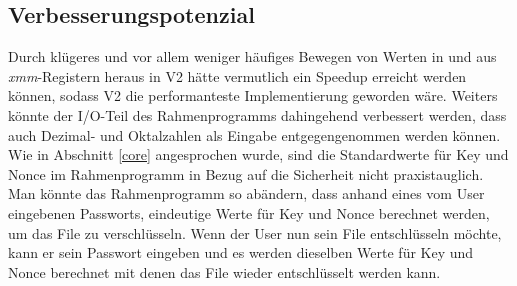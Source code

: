 \documentclass[course=erap]{aspdoc}
\begin{document}
\subsection{Verbesserungspotenzial}
Durch klügeres und vor allem weniger häufiges Bewegen von Werten in und aus \emph{xmm}-Registern heraus
in V2 hätte vermutlich ein Speedup erreicht werden können, sodass V2 die performanteste Implementierung
geworden wäre.
Weiters könnte der I/O-Teil des Rahmenprogramms dahingehend verbessert werden, dass auch Dezimal- und
Oktalzahlen als Eingabe entgegengenommen werden können.
Wie in Abschnitt \ref{core} angesprochen wurde, sind die Standardwerte für Key und Nonce im Ra\-hmen\-pro\-gramm 
in Bezug auf die Sicherheit nicht praxistauglich.
Man könnte das Ra\-hmen\-pro\-gramm so abändern, dass anhand eines vom User eingebenen Passworts, 
eindeutige Werte für Key und Nonce berechnet werden, um das File zu verschlüsseln. Wenn der User nun 
sein File entschlüsseln möchte, kann er sein Passwort eingeben und es werden dieselben Werte für 
Key und Nonce berechnet mit denen das File wieder entschlüsselt werden kann.


{}
\end{document}
